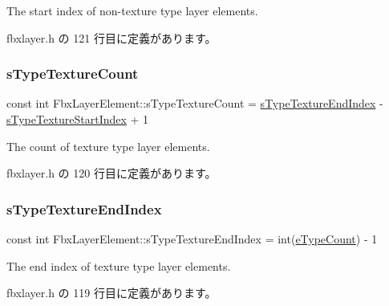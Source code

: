 The start index of non-\/texture type layer elements. 



 fbxlayer.\+h の 121 行目に定義があります。

\mbox{\label{class_fbx_layer_element_ae7a09ea6aa90f96d37a9e161b9f54094}} 
\subsubsection{\texorpdfstring{s\+Type\+Texture\+Count}{sTypeTextureCount}}
{\footnotesize\ttfamily const int Fbx\+Layer\+Element\+::s\+Type\+Texture\+Count = \hyperlink{class_fbx_layer_element_aba954f68e4ad849fe7bd18dcd1d2b3ff}{s\+Type\+Texture\+End\+Index} -\/ \hyperlink{class_fbx_layer_element_a207301b1a6ecb7cdbce89cb44093d0b7}{s\+Type\+Texture\+Start\+Index} + 1\hspace{0.3cm}{\ttfamily [static]}}



The count of texture type layer elements. 



 fbxlayer.\+h の 120 行目に定義があります。

\mbox{\label{class_fbx_layer_element_aba954f68e4ad849fe7bd18dcd1d2b3ff}} 
\subsubsection{\texorpdfstring{s\+Type\+Texture\+End\+Index}{sTypeTextureEndIndex}}
{\footnotesize\ttfamily const int Fbx\+Layer\+Element\+::s\+Type\+Texture\+End\+Index = int(\hyperlink{class_fbx_layer_element_a8c95c5cd880b56c776acd379bd86f42ca0facfbd6e8c7e8dab94db7b1b68166d5}{e\+Type\+Count}) -\/ 1\hspace{0.3cm}{\ttfamily [static]}}



The end index of texture type layer elements. 



 fbxlayer.\+h の 119 行目に定義があります。

